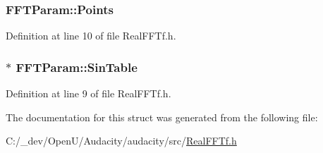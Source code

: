 \subsubsection[{\texorpdfstring{Points}{Points}}]{ F\+F\+T\+Param\+::\+Points}\hypertarget{struct_f_f_t_param_a8d68cf80507059c2372ff865c1a6e665}{}\label{struct_f_f_t_param_a8d68cf80507059c2372ff865c1a6e665}


Definition at line 10 of file Real\+F\+F\+Tf.\+h.

\subsubsection[{\texorpdfstring{Sin\+Table}{SinTable}}]{$\ast$ F\+F\+T\+Param\+::\+Sin\+Table}\hypertarget{struct_f_f_t_param_a31cb8421cbc35c7071687691afc60c25}{}\label{struct_f_f_t_param_a31cb8421cbc35c7071687691afc60c25}


Definition at line 9 of file Real\+F\+F\+Tf.\+h.



The documentation for this struct was generated from the following file\+:\begin{DoxyCompactItemize}
\item 
C\+:/\+\_\+dev/\+Open\+U/\+Audacity/audacity/src/\hyperlink{_real_f_f_tf_8h}{Real\+F\+F\+Tf.\+h}\end{DoxyCompactItemize}
